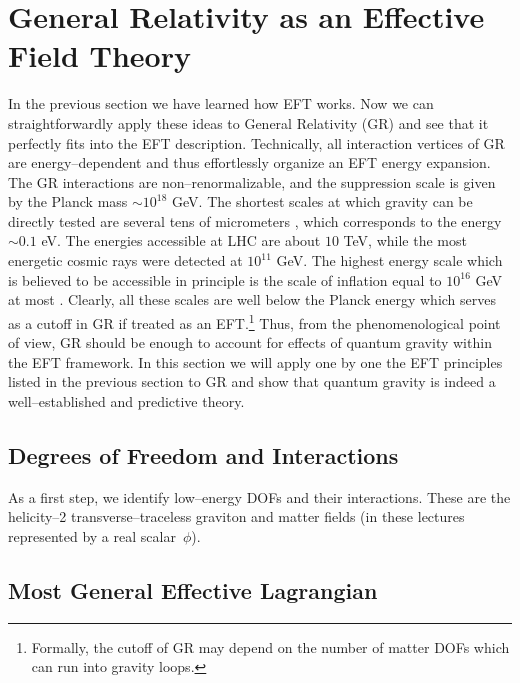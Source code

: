 \documentclass[11pt,a4paper]{article}
\begin{document}
\section{General Relativity as an Effective Field Theory}

In the previous section we have learned
how EFT works. Now we can straightforwardly apply these ideas to
General Relativity (GR) and see that it perfectly fits into the EFT description.
Technically, all interaction vertices of GR are energy--dependent and thus effortlessly
organize an EFT energy expansion.
The GR interactions are non--renormalizable, and the suppression scale is given by the Planck mass $\sim 10^{18}$ GeV.
The shortest scales at which gravity can be directly tested are several tens of micrometers \cite{Tan:2016vwu}, which corresponds to the energy $\sim 0.1$ eV.
The energies accessible at LHC are about $10$ TeV, while the most energetic cosmic rays were detected
at $10^{11}$ GeV.
The highest energy scale which is believed to be accessible in principle
is the scale of inflation equal to $10^{16}$ GeV at most \cite{Planck:2013jfk}.
Clearly, all these scales are well below the Planck energy which serves as a cutoff
in GR if treated as an EFT.\footnote{Formally, the cutoff of GR may depend on the number of matter DOFs which can run into gravity loops.}
Thus, from the phenomenological point of view,
GR should be enough to account for effects of quantum gravity within the EFT framework.
In this section we will apply one by one the EFT principles listed in the previous section to GR
and show that quantum gravity is indeed a well--established and predictive theory.

\subsection{Degrees of Freedom and Interactions}

As a first step, we identify low--energy DOFs and their interactions. These are
the helicity--2 transverse--traceless graviton and matter fields (in these lectures represented by a real scalar~$\phi$).

\subsection{Most General Effective Lagrangian}
\label{sec:larg}
\end{document}

